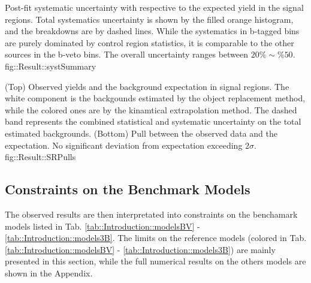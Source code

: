 {
    Post-fit systematic uncertainty with respective to the expected yield in the signal regions. 
    Total systematics uncertainty is shown by the filled orange histogram, and the breakdowns are by dashed lines.
    While the systematics in b-tagged bins are purely dominated by control region statistics, 
    it is comparable to the other sources in the b-veto bins. The overall uncertainty ranges between $20\%\sim\%50$.
}       
{fig::Result::systSummary}
    
{
    (Top) Observed yields and the background expectation in signal regions. The white component is the backgounds estimated by the object replacement method, while the colored ones are by the kinamtical extrapolation method. The dashed band represents the combined statistical and systematic uncertainty on the total estimated backgrounds.
    (Bottom) Pull between the observed data and the expectation. No significant deviation from expectation exceeding $2\sigma$.
}
{fig::Result::SRPulls}

                                                                                                                         
\clearpage
\subsection{Constraints on the Benchmark Models}
The observed results are then interpretated into constraints on the benchamark models listed in Tab. \ref{tab::Introduction::modelsBV} - \ref{tab::Introduction::models3B}. The limits on the reference models (colored in Tab. \ref{tab::Introduction::modelsBV} - \ref{tab::Introduction::models3B}) are mainly presented in this section, while the full numerical results on the others models are shown in the Appendix. \\


